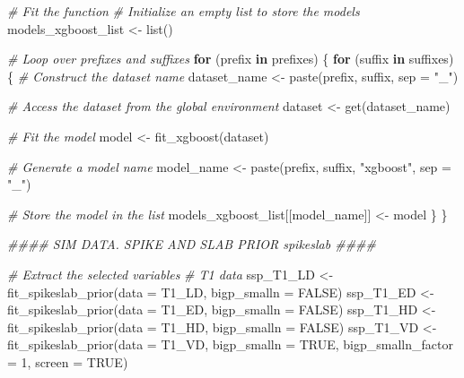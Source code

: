 \documentclass[
  11pt,
]{article}
\newenvironment{Shaded}{}{}
\newcommand{\AttributeTok}[1]{\textcolor[rgb]{0.49,0.56,0.16}{#1}}
\newcommand{\CommentTok}[1]{\textcolor[rgb]{0.38,0.63,0.69}{\textit{#1}}}
\newcommand{\ConstantTok}[1]{\textcolor[rgb]{0.53,0.00,0.00}{#1}}
\newcommand{\ControlFlowTok}[1]{\textcolor[rgb]{0.00,0.44,0.13}{\textbf{#1}}}
\newcommand{\DecValTok}[1]{\textcolor[rgb]{0.25,0.63,0.44}{#1}}
\newcommand{\DocumentationTok}[1]{\textcolor[rgb]{0.73,0.13,0.13}{\textit{#1}}}
\newcommand{\FunctionTok}[1]{\textcolor[rgb]{0.02,0.16,0.49}{#1}}
\newcommand{\NormalTok}[1]{#1}
\newcommand{\OtherTok}[1]{\textcolor[rgb]{0.00,0.44,0.13}{#1}}
\newcommand{\StringTok}[1]{\textcolor[rgb]{0.25,0.44,0.63}{#1}}
\begin{document}
\begin{Shaded}
\begin{Highlighting}[]
\CommentTok{\# Fit the function}
\CommentTok{\# Initialize an empty list to store the models}
\NormalTok{models\_xgboost\_list }\OtherTok{\textless{}{-}} \FunctionTok{list}\NormalTok{()}

\CommentTok{\# Loop over prefixes and suffixes}
\ControlFlowTok{for}\NormalTok{ (prefix }\ControlFlowTok{in}\NormalTok{ prefixes) \{}
  \ControlFlowTok{for}\NormalTok{ (suffix }\ControlFlowTok{in}\NormalTok{ suffixes) \{}
    \CommentTok{\# Construct the dataset name}
\NormalTok{    dataset\_name }\OtherTok{\textless{}{-}} \FunctionTok{paste}\NormalTok{(prefix, suffix, }\AttributeTok{sep =} \StringTok{"\_"}\NormalTok{)}
    
    \CommentTok{\# Access the dataset from the global environment}
\NormalTok{    dataset }\OtherTok{\textless{}{-}} \FunctionTok{get}\NormalTok{(dataset\_name)}
    
    \CommentTok{\# Fit the model}
\NormalTok{    model }\OtherTok{\textless{}{-}} \FunctionTok{fit\_xgboost}\NormalTok{(dataset)}
    
    \CommentTok{\# Generate a model name}
\NormalTok{    model\_name }\OtherTok{\textless{}{-}} \FunctionTok{paste}\NormalTok{(prefix, suffix, }\StringTok{"xgboost"}\NormalTok{, }\AttributeTok{sep =} \StringTok{"\_"}\NormalTok{)}
    
    \CommentTok{\# Store the model in the list}
\NormalTok{    models\_xgboost\_list[[model\_name]] }\OtherTok{\textless{}{-}}\NormalTok{ model}
\NormalTok{  \}}
\NormalTok{\}}

\DocumentationTok{\#\#\#\# SIM DATA. SPIKE AND SLAB PRIOR \textquotesingle{}spikeslab\textquotesingle{} \#\#\#\# }

\CommentTok{\# Extract the selected variables}
\CommentTok{\# T1 data}
\NormalTok{ssp\_T1\_LD }\OtherTok{\textless{}{-}} \FunctionTok{fit\_spikeslab\_prior}\NormalTok{(}\AttributeTok{data =}\NormalTok{ T1\_LD, }\AttributeTok{bigp\_smalln =} \ConstantTok{FALSE}\NormalTok{)}
\NormalTok{ssp\_T1\_ED }\OtherTok{\textless{}{-}} \FunctionTok{fit\_spikeslab\_prior}\NormalTok{(}\AttributeTok{data =}\NormalTok{ T1\_ED, }\AttributeTok{bigp\_smalln =} \ConstantTok{FALSE}\NormalTok{)}
\NormalTok{ssp\_T1\_HD }\OtherTok{\textless{}{-}} \FunctionTok{fit\_spikeslab\_prior}\NormalTok{(}\AttributeTok{data =}\NormalTok{ T1\_HD, }\AttributeTok{bigp\_smalln =} \ConstantTok{FALSE}\NormalTok{)}
\NormalTok{ssp\_T1\_VD }\OtherTok{\textless{}{-}} \FunctionTok{fit\_spikeslab\_prior}\NormalTok{(}\AttributeTok{data =}\NormalTok{ T1\_VD, }\AttributeTok{bigp\_smalln =} \ConstantTok{TRUE}\NormalTok{, }
                                 \AttributeTok{bigp\_smalln\_factor =} \DecValTok{1}\NormalTok{, }\AttributeTok{screen =} \ConstantTok{TRUE}\NormalTok{)}


\end{Highlighting}
\end{Shaded}
\end{document}
